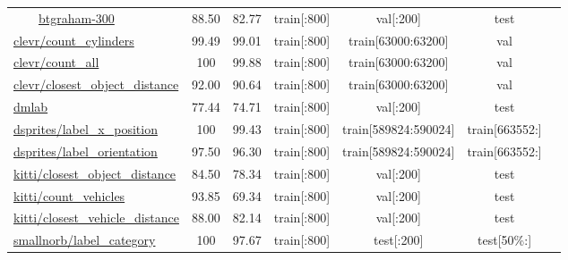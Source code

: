 \documentclass{article} \usepackage{iclr2023_conference,times}
\begin{document}
\begin{table*}[h]
\begin{tabular}{lcccccc}
\ \ \ \ \href{https://www.tensorflow.org/datasets/catalog/diabetic_retinopathy_detection/#diabetic_retinopathy_detectionbtgraham-300}{btgraham-300}
&  88.50  &  82.77
& train[{\tiny:800}] & val[{\tiny:200}] & test
& \hspace{-10pt}\citep{kaggle-diabetic-retinopathy}
\\
\href{https://www.tensorflow.org/datasets/catalog/clevr}{clevr/count\_cylinders}
 &  99.49  &  99.01
& train[{\tiny:800}] & train[{\tiny63000:63200}] & val
& \citep{Johnson2017CLEVRAD}
\\
\href{https://www.tensorflow.org/datasets/catalog/clevr}{clevr/count\_all}
&  100  &  99.88
& train[{\tiny:800}] & train[{\tiny63000:63200}] & val
& \citep{Johnson2017CLEVRAD}
\\
\href{https://www.tensorflow.org/datasets/catalog/clevr}{clevr/closest\_object\_distance}
&  92.00  &  90.64
& train[{\tiny:800}] & train[{\tiny63000:63200}] & val
& \citep{Johnson2017CLEVRAD}
\\
\href{https://www.tensorflow.org/datasets/catalog/dmlab}{dmlab}
&  77.44  &  74.71
& train[{\tiny:800}] & val[{\tiny:200}] & test
& \citep{Zhai2019TheVT}
\\
\href{https://www.tensorflow.org/datasets/catalog/dsprites}{dsprites/label\_x\_position}
&  100  &  99.43
& train[{\tiny:800}] & train[{\tiny589824:590024}] & train[{\tiny663552:}]
& \citep{Klindt2021TowardsND}
\\
\href{https://www.tensorflow.org/datasets/catalog/dsprites}{dsprites/label\_orientation}
&  97.50  &  96.30
& train[{\tiny:800}] & train[{\tiny589824:590024}] & train[{\tiny663552:}]
& \citep{Klindt2021TowardsND}
\\
\href{https://www.tensorflow.org/datasets/catalog/kitti}{kitti/closest\_object\_distance}
&  84.50  &  78.34
& train[{\tiny:800}] & val[{\tiny:200}] & test
& \citep{Geiger2012AreWR}
\\
\href{https://www.tensorflow.org/datasets/catalog/kitti}{kitti/count\_vehicles}
&  93.85  &  69.34
& train[{\tiny:800}] & val[{\tiny:200}] & test
& \citep{Geiger2012AreWR}
\\
\href{https://www.tensorflow.org/datasets/catalog/kitti}{kitti/closest\_vehicle\_distance}
&  88.00  &  82.14
& train[{\tiny:800}] & val[{\tiny:200}] & test
& \citep{Geiger2012AreWR}
\\
\href{https://www.tensorflow.org/datasets/catalog/smallnorb}{smallnorb/label\_category}
&  100  &  97.67
& train[{\tiny:800}] & test[{\tiny:200}] & test[{\tiny50\%:}]
& \citep{LeCun2004LearningMF}

\end{tabular}
\end{table*}
\end{document}

